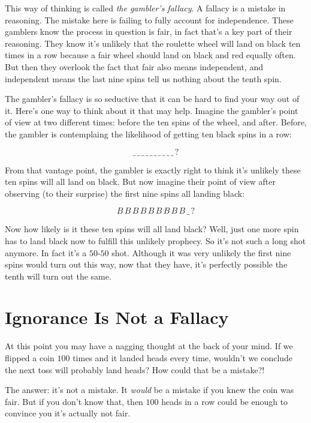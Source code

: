 \documentclass[justified]{tufte-book}
\theoremstyle{definition}
\theoremstyle{definition}
\theoremstyle{definition}
\theoremstyle{definition}
\theoremstyle{remark}
\begin{document}
This way of thinking is called \emph{the gambler's fallacy}. A fallacy is a mistake in reasoning. The mistake here is failing to fully account for independence. These gamblers know the process in question is fair, in fact that's a key part of their reasoning. They know it's unlikely that the roulette wheel will land on black ten times in a row because a fair wheel should land on black and red equally often. But then they overlook the fact that fair also means independent, and independent means the last nine spins tell us nothing about the tenth spin.

The gambler's fallacy is so seductive that it can be hard to find your way out of it. Here's one way to think about it that may help. Imagine the gambler's point of view at two different times: before the ten spins of the wheel, and after. Before, the gambler is contemplaing the likelihood of getting ten black spins in a row:

\[  \_ \, \_ \,\_ \,\_ \,\_ \,\_ \,\_ \,\_ \,\_ \,\_ \, ? \]

From that vantage point, the gambler is exactly right to think it's unlikely these ten spins will all land on black. But now imagine their point of view after observing (to their surprise) the first nine spins all landing black:

\[ B \, B \, B \, B \, B \, B \, B \, B \, B  \, \_ \,? \]

Now how likely is it these ten spins will all land black? Well, just one more spin has to land black now to fulfill this unlikely prophecy. So it's not such a long shot anymore. In fact it's a \(50\)-\(50\) shot. Although it was very unlikely the first nine spins would turn out this way, now that they have, it's perfectly possible the tenth will turn out the same.

\hypertarget{ignorance-is-not-a-fallacy}{%
\section{Ignorance Is Not a Fallacy}\label{ignorance-is-not-a-fallacy}}

At this point you may have a nagging thought at the back of your mind. If we flipped a coin \(100\) times and it landed heads every time, wouldn't we conclude the next toss will probably land heads? How could that be a mistake?!

The answer: it's not a mistake. It \emph{would} be a mistake if you knew the coin was fair. But if you don't know that, then \(100\) heads in a row could be enough to convince you it's actually not fair.
\end{document}
